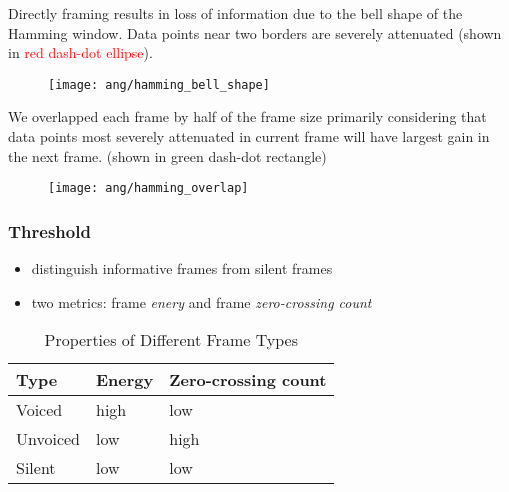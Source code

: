 
\begin{frame}
Directly framing results in loss of information due to the bell shape of the Hamming window. Data points near two borders are severely attenuated (shown in \textcolor{red}{red dash-dot ellipse}).
\begin{figure}[H]
\centering
\texttt{[image: ang/hamming\_bell\_shape]}
\end{figure}
\end{frame}


\begin{frame}
We overlapped each frame by half of the frame size primarily considering that data points most severely attenuated in current frame will have largest gain in the next frame. (shown in \textcolor{green_html}{green dash-dot rectangle})
\begin{figure}[H]
\centering
\texttt{[image: ang/hamming\_overlap]}
\end{figure}
\end{frame}


\begin{frame}
\frametitle{Threshold}
\begin{itemize}
\item distinguish informative frames from silent frames
\item two metrics: frame \textit{enery} and frame \textit{zero-crossing count}
\end{itemize}

\begin{table}[H]
\centering
\caption{Properties of Different Frame Types}
\begin{tabu} to 0.9\textwidth {X[c]X[c]X[c]}
\toprule
Type &Energy &Zero-crossing count\\
\hline
Voiced &high &low\\
\hline
Unvoiced &low &high\\
\hline
Silent &low &low\\
\bottomrule
\end{tabu}
\end{table}
\end{frame}

